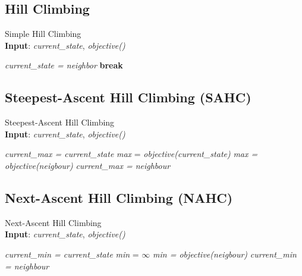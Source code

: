 \documentclass[12pt,twoside]{article}
\begin{document}
	\subsection{Hill Climbing}
	
	\begin{algorithm}[H]
		\caption{Simple Hill Climbing \\ \textbf{Input}: \textit{current\_state}, \textit{objective()}}
		\begin{algorithmic}[1]
			\State \textit{current\_state = neighbor} 
			\State \textbf{break}
			\EndIf
			\EndFor\\
		\end{algorithmic}
		\label{alg:shc}
	\end{algorithm}
	
	\subsection{Steepest-Ascent Hill Climbing (SAHC)}

	\begin{algorithm}[H]
		\caption{Steepest-Ascent Hill Climbing\\ \textbf{Input}: \textit{current\_state}, \textit{objective()}}
		\begin{algorithmic}[1]
			\State \textit{current\_max = current\_state}
			\State \textit{max} = \textit{objective(current\_state)}
			\State	\textit{max = objective(neigbour)}
			\State	\textit{current\_max = neighbour}
			\EndIf
			\EndFor\\
		\end{algorithmic}
		\label{alg:sahc}
	\end{algorithm}
		
	\subsection{Next-Ascent Hill Climbing (NAHC)}
	
	\begin{algorithm}[H]
		\caption{Next-Ascent Hill Climbing\\ \textbf{Input}: \textit{current\_state}, \textit{objective()}}
		\begin{algorithmic}[1]
			\State \textit{current\_min = current\_state}
			\State \textit{min} = $\infty$
			\State	\textit{min = objective(neigbour)}
			\State	\textit{current\_min = neighbour}
			\EndIf
			\EndFor\\
		\end{algorithmic}
		\label{alg:nahc}
	\end{algorithm}
	
\end{document}
